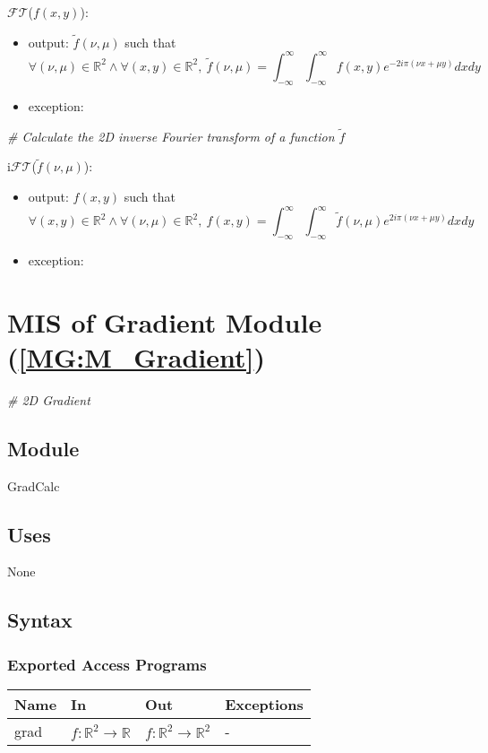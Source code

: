 \documentclass[12pt, titlepage]{article}
\begin{document}
\noindent $\mathcal{FT}$($f(x,y)$):
\begin{itemize} 
\item output: $\widetilde{f}(\nu,\mu)$ such that 
\begin{equation*}
\forall (\nu,\mu) \in \mathbb{R}^2 \wedge \forall (x,y) \in \mathbb{R}^2, \ \widetilde{f}(\nu,\mu)=\int_{-\infty}^{\infty}\int_{-\infty}^{\infty}f(x,y)e^{-2i\pi(\nu x+\mu y)}dxdy
\end{equation*}
\item exception:
\end{itemize}

\noindent\textit{{\#} Calculate the 2D inverse Fourier transform of a function $\widetilde{f}$}\medskip

\noindent i$\mathcal{FT}$($\widetilde{f}(\nu,\mu)$):
\begin{itemize} 
\item output: $f(x,y)$ such that 
\begin{equation*}
\forall (x,y) \in \mathbb{R}^2 \wedge \forall (\nu,\mu) \in \mathbb{R}^2 , \ f(x,y)=\int_{-\infty}^{\infty}\int_{-\infty}^{\infty}\widetilde{f}(\nu,\mu)e^{2i\pi(\nu x+\mu y)}dxdy
\end{equation*}
\item exception:
\end{itemize}

\section{MIS of Gradient Module (\texorpdfstring{\cref{MG:M_Gradient}}))} \label{MIS_Gradient}

\textit{{\#} 2D Gradient} \medskip

\subsection{Module}
GradCalc
\subsection{Uses}
None
\subsection{Syntax}

\subsubsection{Exported Access Programs}
\begin{center}
\begin{tabular}{p{2cm} p{4cm} p{4cm} p{2cm}}
\hline
\textbf{Name} & \textbf{In} & \textbf{Out} & \textbf{Exceptions} \\
\hline
grad & $f:\mathbb{R}^2\rightarrow\mathbb{R}$  & $f:\mathbb{R}^2\rightarrow\mathbb{R}^2$ & -\\
\hline
\end{tabular}
\end{center}
\end{document}
